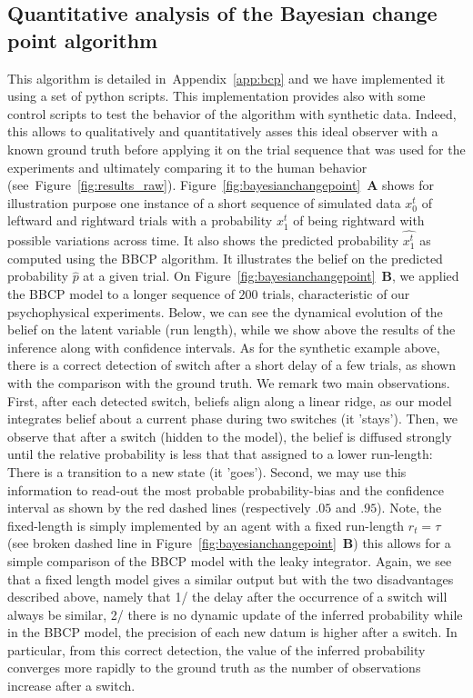 \documentclass[12pt,english]{article}%
\newcommand{\seeFig}[1]{Figure~\ref{fig:#1}}
\newcommand{\seeApp}[1]{Appendix~\ref{app:#1}}
\begin{document}
\subsection{Quantitative analysis of the Bayesian change point algorithm}
This algorithm is detailed in~\seeApp{bcp} and 
we have implemented it using a set of python scripts.
This implementation provides also with some control scripts
to test the behavior of the algorithm with synthetic data.
Indeed, this allows to qualitatively and quantitatively asses
this ideal observer with a known ground truth before applying it
on the trial sequence that was used for the experiments and 
ultimately comparing it to the human behavior (see~\seeFig{results_raw}).
\seeFig{bayesianchangepoint}~\textbf{A} shows for illustration purpose
one instance of a short sequence of simulated data $x_0^t$
of leftward and rightward trials with a probability $x_1^t$
of being rightward with possible variations across time.
It also shows the predicted probability $\hat{x_1^t}$
as computed using the BBCP algorithm.
It illustrates
the belief on the predicted probability $\hat{p}$ at a given trial.
On \seeFig{bayesianchangepoint}~\textbf{B},
we applied the BBCP model to 
a longer sequence of $200$ trials,
characteristic of our psychophysical experiments.
Below, 
we can see the dynamical evolution of the belief on the latent variable (run length),
while we show above the results of the inference along with confidence intervals.
As for the synthetic example above,
there is a correct detection of switch after a short delay of a few trials,
as shown with the comparison with the ground truth.
We remark two main observations.
First, after each detected switch, beliefs align along a linear ridge,
as our model integrates belief about a current phase during two switches (it 'stays').
Then, we observe that after a switch (hidden to the model),
the belief is diffused strongly until the relative probability
is less that that assigned to a lower run-length:
There is a transition to a new state (it 'goes').
Second, we may use this information to read-out the most probable probability-bias and the confidence interval
as shown by the red dashed lines (respectively $.05$ and $.95$).
Note, the fixed-length is simply implemented
by an agent with a fixed run-length $r_t=\tau$ (see broken dashed line in \seeFig{bayesianchangepoint}~\textbf{B})
this allows for a simple comparison of the BBCP model with the leaky integrator.
Again, we see that a fixed length model gives a similar output
but with the two disadvantages described above, namely that
1/ the delay after the occurrence of a switch will always be similar,
2/ there is no dynamic update of the inferred probability 
while in the BBCP model, the precision of each new datum 
is higher after a switch.
In particular, from this correct detection,
the value of the inferred probability converges more rapidly to the ground truth
as the number of observations increase after a switch.
\end{document}

